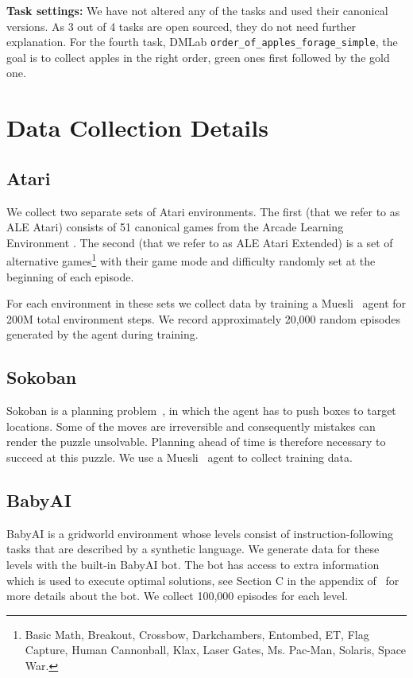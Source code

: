 \documentclass[10pt]{article} \usepackage[accepted]{tmlr}
\newcommand{\atari}{{ALE Atari}}
\newcommand{\ataritwo}{{ALE Atari Extended}}
\begin{document}
\noindent \textbf{Task settings:} We have not altered any of the tasks and used their canonical versions. As 3 out of 4 tasks are open sourced, they do not need further explanation. For the fourth task, DMLab \texttt{order\_of\_apples\_forage\_simple}, the goal is to collect apples in the right order, green ones first followed by the gold one.

\section{Data Collection Details}
\label{sec:data-collection}
\subsection{Atari}
\label{sec:atari_details}
\vskip 0.2cm
We collect two separate sets of Atari environments.
The first (that we refer to as \atari{}) consists of 51 canonical games from the Arcade Learning Environment \citep{bellemare2013arcade}.
The second (that we refer to as \ataritwo{}) is a set of alternative
games\footnote{Basic Math, Breakout, Crossbow, Darkchambers, Entombed, ET, Flag Capture, Human Cannonball, Klax, Laser Gates, Ms. Pac-Man, Solaris, Space War.}
with their game mode and difficulty randomly set at the beginning of each episode.

For each environment in these sets we collect data by training a Muesli~\citep{hessel2021muesli} agent for 200M total environment steps. We record approximately 20,000 random episodes generated by the agent during training.
\vskip 0.4cm
\subsection{Sokoban}
\vskip 0.2cm
Sokoban is a planning problem~\citep{racaniere2017imagination}, in which the agent has to push boxes to target
locations. Some of the moves are irreversible and consequently
mistakes can render the puzzle unsolvable. Planning ahead of time is therefore necessary to succeed at this puzzle.
We use a Muesli~\citep{hessel2021muesli} agent to collect training data.
\vskip 0.4cm
\subsection{BabyAI}
\vskip 0.2cm
BabyAI is a gridworld environment whose levels consist of instruction-following tasks that are described by a synthetic language. We generate data for these levels with the built-in BabyAI bot. 
The bot has access to extra information which is used to execute optimal solutions, see Section C in the appendix of~\citep{chevalier2018babyai} for more details about the bot. We collect 100,000 episodes for each level.
\vskip 0.4cm
\end{document}
